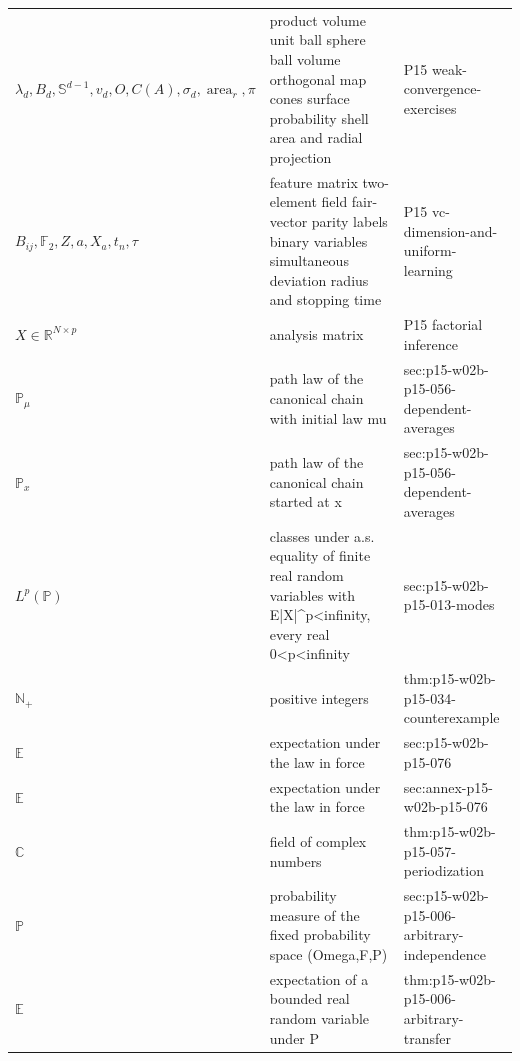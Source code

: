 \begin{longtable}{@{}p{}p{}p{}@{}}
\(\lambda_d,\allowbreak B_d,\allowbreak \mathbb S^{d-1},\allowbreak v_d,\allowbreak O,\allowbreak C(A),\allowbreak \sigma_d,\allowbreak \operatorname{area}_r,\allowbreak \pi\) & product volume unit ball sphere ball volume orthogonal map cones surface probability shell area and radial projection & P15 weak-\allowbreak{}convergence-\allowbreak{}exercises \\
\(B_{ij},\allowbreak \mathbb F_2,\allowbreak Z,\allowbreak a,\allowbreak X_a,\allowbreak t_n,\allowbreak \tau\) & feature matrix two-element field fair-vector parity labels binary variables simultaneous deviation radius and stopping time & P15 vc-\allowbreak{}dimension-\allowbreak{}and-\allowbreak{}uniform-\allowbreak{}learning \\
\(X\in\mathbb R^{N\times p}\) & analysis matrix & P15 factorial inference \\
\(\mathbb P_\mu\) & path law of the canonical chain with initial law mu & sec:\allowbreak{}p15-\allowbreak{}w02b-\allowbreak{}p15-\allowbreak{}056-\allowbreak{}dependent-\allowbreak{}averages \\
\(\mathbb P_x\) & path law of the canonical chain started at x & sec:\allowbreak{}p15-\allowbreak{}w02b-\allowbreak{}p15-\allowbreak{}056-\allowbreak{}dependent-\allowbreak{}averages \\
\(L^p(\mathbb P)\) & classes under a.s. equality of finite real random variables with E|X|\^{}p<infinity, every real 0<p<infinity & sec:\allowbreak{}p15-\allowbreak{}w02b-\allowbreak{}p15-\allowbreak{}013-\allowbreak{}modes \\
\(\mathbb N_+\) & positive integers & thm:\allowbreak{}p15-\allowbreak{}w02b-\allowbreak{}p15-\allowbreak{}034-\allowbreak{}counterexample \\
\(\mathbb E\) & expectation under the law in force & sec:\allowbreak{}p15-\allowbreak{}w02b-\allowbreak{}p15-\allowbreak{}076 \\
\(\mathbb E\) & expectation under the law in force & sec:\allowbreak{}annex-\allowbreak{}p15-\allowbreak{}w02b-\allowbreak{}p15-\allowbreak{}076 \\
\(\mathbb C\) & field of complex numbers & thm:\allowbreak{}p15-\allowbreak{}w02b-\allowbreak{}p15-\allowbreak{}057-\allowbreak{}periodization \\
\(\mathbb P\) & probability measure of the fixed probability space (Omega,F,P) & sec:\allowbreak{}p15-\allowbreak{}w02b-\allowbreak{}p15-\allowbreak{}006-\allowbreak{}arbitrary-\allowbreak{}independence \\
\(\mathbb E\) & expectation of a bounded real random variable under P & thm:\allowbreak{}p15-\allowbreak{}w02b-\allowbreak{}p15-\allowbreak{}006-\allowbreak{}arbitrary-\allowbreak{}transfer \\

\end{longtable}
